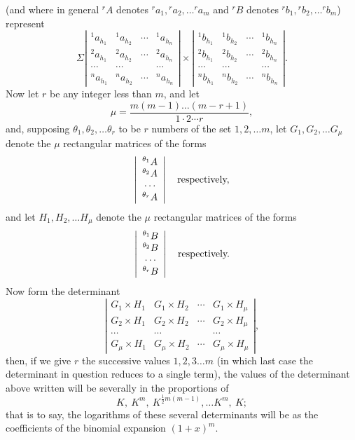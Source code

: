 \documentclass[11pt]{article}
\newcommand{\sourcepage}[1]{\marginpar{\scriptsize p.~#1}}
\begin{document}
{{\sourcepage{400}
(and where in general ${}^rA$ denotes ${}^ra_1,{}^ra_2,\ldots{}^ra_m$ and ${}^rB$ denotes ${}^rb_1,{}^rb_2,\ldots{}^rb_m$) represent
\[
\Sigma
\left|\begin{array}{cccc}
{}^1a_{h_1}&{}^1a_{h_2}&\cdots&{}^1a_{h_n}\\
{}^2a_{h_1}&{}^2a_{h_2}&\cdots&{}^2a_{h_n}\\
\cdots&\cdots&&\cdots\\
{}^na_{h_1}&{}^na_{h_2}&\cdots&{}^na_{h_n}
\end{array}\right|
\times
\left|\begin{array}{cccc}
{}^1b_{h_1}&{}^1b_{h_2}&\cdots&{}^1b_{h_n}\\
{}^2b_{h_1}&{}^2b_{h_2}&\cdots&{}^2b_{h_n}\\
\cdots&\cdots&&\cdots\\
{}^nb_{h_1}&{}^nb_{h_2}&\cdots&{}^nb_{h_n}
\end{array}\right|.
\]
Now let $r$ be any integer less than $m$, and let
\[
\mu=\frac{m(m-1)\ldots(m-r+1)}{1\cdot2\cdots r},
\]
and, supposing $\theta_1,\theta_2,\ldots\theta_r$ to be $r$ numbers of the set $1,2,\ldots m$, let $G_1,G_2,\ldots G_\mu$ denote the $\mu$ rectangular matrices of the forms
\[
\left|\begin{array}{c}
{}^{\theta_1}A\\
{}^{\theta_2}A\\
\cdots\\
{}^{\theta_r}A
\end{array}\right|
\quad\hbox{respectively,}
\]
and let $H_1,H_2,\ldots H_\mu$ denote the $\mu$ rectangular matrices of the forms
\[
\left|\begin{array}{c}
{}^{\theta_1}B\\
{}^{\theta_2}B\\
\cdots\\
{}^{\theta_r}B
\end{array}\right|
\quad\hbox{respectively.}
\]
Now form the determinant
\[
\left|\begin{array}{cccc}
G_1\times H_1&G_1\times H_2&\cdots&G_1\times H_\mu\\
G_2\times H_1&G_2\times H_2&\cdots&G_2\times H_\mu\\
\cdots&\cdots&&\cdots\\
G_\mu\times H_1&G_\mu\times H_2&\cdots&G_\mu\times H_\mu
\end{array}\right|,
\]
then, if we give $r$ the successive values $1,2,3\ldots m$ (in which last case the determinant in question reduces to a single term), the values of the determinant above written will be severally in the proportions of
\[
K,\ K^m,\ K^{\frac12m(m-1)},\ldots K^m,\ K;
\]
that is to say, the logarithms of these several determinants will be as the coefficients of the binomial expansion $(1+x)^m$.

}}
\end{document}
